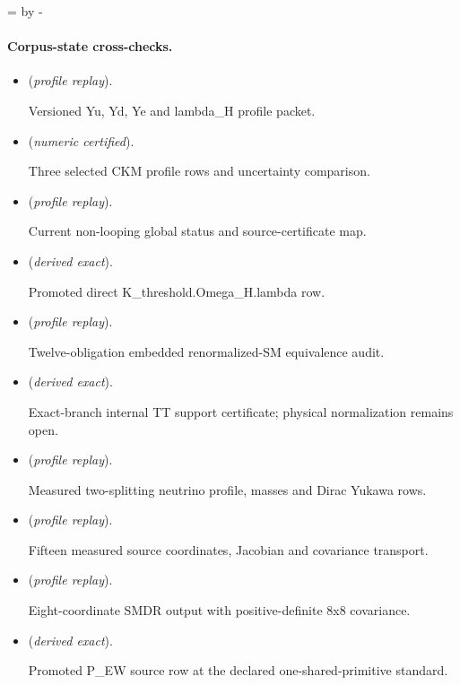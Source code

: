 \documentclass[11pt]{article}
\begin{document}
\par\begingroup{}=\pagegoal\advance{} by -\pagetotal\ifdim\dimen0<7\baselineskip\newpage\fi\endgroup
\paragraph{Corpus-state cross-checks.}
\begin{itemize}
\setlength{\itemsep}{0.25em}
\item {} (\emph{profile replay}).\par Versioned Yu, Yd, Ye and lambda\_H profile packet.
\item {} (\emph{numeric certified}).\par Three selected CKM profile rows and uncertainty comparison.
\item {} (\emph{profile replay}).\par Current non-looping global status and source-certificate map.
\item {} (\emph{derived exact}).\par Promoted direct K\_threshold.Omega\_H.lambda row.
\item {} (\emph{profile replay}).\par Twelve-obligation embedded renormalized-SM equivalence audit.
\item {} (\emph{derived exact}).\par Exact-branch internal TT support certificate; physical normalization remains open.
\item {} (\emph{profile replay}).\par Measured two-splitting neutrino profile, masses and Dirac Yukawa rows.
\item {} (\emph{profile replay}).\par Fifteen measured source coordinates, Jacobian and covariance transport.
\item {} (\emph{profile replay}).\par Eight-coordinate SMDR output with positive-definite 8x8 covariance.
\item {} (\emph{derived exact}).\par Promoted P\_EW source row at the declared one-shared-primitive standard.
\end{itemize}
\end{document}
